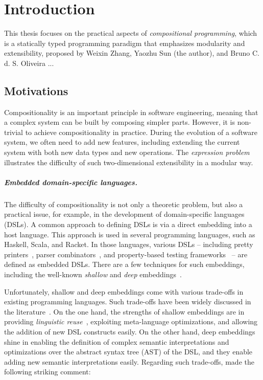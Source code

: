 \chapter{Introduction} \label{ch:introduction}

This thesis focuses on the practical aspects of \emph{compositional
programming}, which is a statically typed programming paradigm that emphasizes
modularity and extensibility, proposed by Weixin Zhang, Yaozhu Sun (the author),
and Bruno C. d. S. Oliveira \citeyearpar{zhang2021compositional}...

\section{Motivations}

Compositionality is an important principle in software engineering, meaning
that a complex system can be built by composing simpler parts. However, it is
non-trivial to achieve compositionality in practice. During the evolution of a
software system, we often need to add new features, including extending the
current system with both new data types and new operations. The \emph{expression
problem}~\citep{wadler1998expression} illustrates the difficulty of such
two-dimensional extensibility in a modular way.

\paragraph{Embedded domain-specific languages.}
The difficulty of compositionality is not only a theoretic problem, but also a
practical issue, for example, in the development of domain-specific languages
(DSLs). A common approach to defining DSLs is via a direct embedding into a host
language. This approach is used in several programming languages, such as
Haskell, Scala, and Racket. In those languages, various DSLs -- including pretty
printers~\citep{hughes1995design,wadler2003prettier}, parser
combinators~\citep{leijen2001parsec}, and property-based testing
frameworks~\citep{claessen2000quickcheck} -- are defined as embedded DSLs. There
are a few techniques for such embeddings, including the well-known
\emph{shallow} and \emph{deep} embeddings~\citep{boulton1992experience}.

Unfortunately, shallow and deep embeddings come with various trade-offs in
existing programming languages. Such trade-offs have been widely discussed in
the literature~\citep{rompf2012scala,scherr2014implicit,gibbons2014folding}. On
the one hand, the strengths of shallow embeddings are in providing
\emph{linguistic reuse}~\citep{krishnamurthi2001linguistic}, exploiting
meta-language optimizations, and allowing the addition of new DSL constructs
easily. On the other hand, deep embeddings shine in enabling the definition of
complex semantic interpretations and optimizations over the abstract syntax tree
(AST) of the DSL, and they enable adding new semantic interpretations easily.
Regarding such trade-offs, \citet{svenningsson2015combining} made the following
striking comment:


